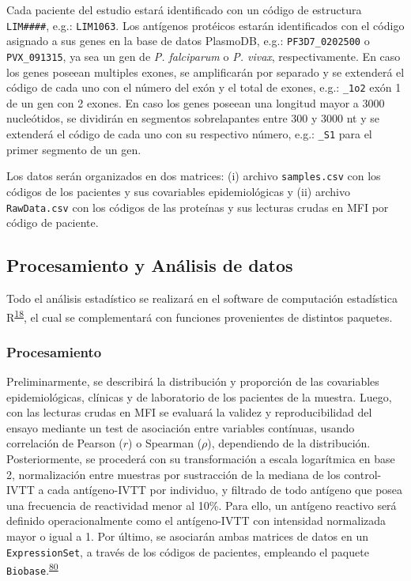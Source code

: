 \documentclass[]{article}
\begin{document}
Cada paciente del estudio estará identificado con un código de
estructura \texttt{LIM\#\#\#\#}, e.g.: \texttt{LIM1063}. Los antígenos
protéicos estarán identificados con el código asignado a sus genes en la
base de datos PlasmoDB, e.g.: \texttt{PF3D7\_0202500} o
\texttt{PVX\_091315}, ya sea un gen de \emph{P. falciparum} o \emph{P.
vivax}, respectivamente. En caso los genes poseean multiples exones, se
amplificarán por separado y se extenderá el código de cada uno con el
número del exón y el total de exones, e.g.: \texttt{\_1o2} exón 1 de un
gen con 2 exones. En caso los genes poseean una longitud mayor a 3000
nucleótidos, se dividirán en segmentos sobrelapantes entre 300 y 3000 nt
y se extenderá el código de cada uno con su respectivo número, e.g.:
\texttt{\_S1} para el primer segmento de un gen.

Los datos serán organizados en dos matrices: (i) archivo
\texttt{samples.csv} con los códigos de los pacientes y sus covariables
epidemiológicas y (ii) archivo \texttt{RawData.csv} con los códigos de
las proteínas y sus lecturas crudas en MFI por código de paciente.

\hypertarget{procanal}{\subsection{Procesamiento y Análisis de
datos}\label{procanal}}

Todo el análisis estadístico se realizará en el software de computación
estadística R\textsuperscript{\protect\hyperlink{ref-R}{18}}, el cual se
complementará con funciones provenientes de distintos paquetes.

\subsubsection{Procesamiento}\label{procesamiento}

Preliminarmente, se describirá la distribución y proporción de las
covariables epidemiológicas, clínicas y de laboratorio de los pacientes
de la muestra. Luego, con las lecturas crudas en MFI se evaluará la
validez y reproducibilidad del ensayo mediante un test de asociación
entre variables contínuas, usando correlación de Pearson (\(r\)) o
Spearman (\(\rho\)), dependiendo de la distribución. Posteriormente, se
procederá con su transformación a escala logarítmica en base 2,
normalización entre muestras por sustracción de la mediana de los
control-IVTT a cada antígeno-IVTT por individuo, y filtrado de todo
antígeno que posea una frecuencia de reactividad menor al 10\%. Para
ello, un antígeno reactivo será definido operacionalmente como el
antígeno-IVTT con intensidad normalizada mayor o igual a 1. Por último,
se asociarán ambas matrices de datos en un \texttt{ExpressionSet}, a
través de los códigos de pacientes, empleando el paquete
\texttt{Biobase}.\textsuperscript{\protect\hyperlink{ref-Biobase}{80}}
\end{document}
